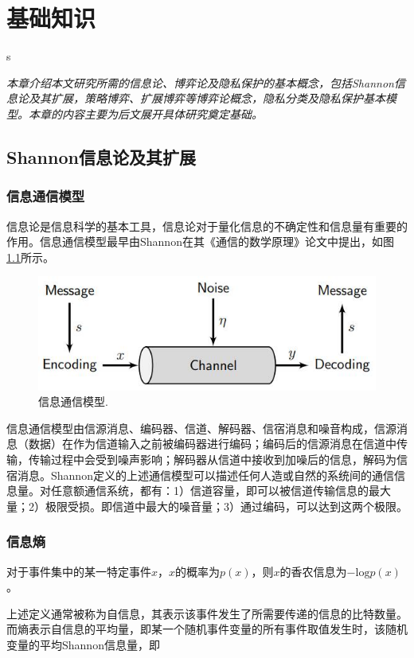\chapter{基础知识}
\label{chap:preliminary}

\textit{}s

\textit{本章介绍本文研究所需的信息论、博弈论及隐私保护的基本概念，包括Shannon信息论及其扩展，策略博弈、扩展博弈等博弈论概念，隐私分类及隐私保护基本模型。本章的内容主要为后文展开具体研究奠定基础。}
\section{Shannon信息论及其扩展}

\subsection{信息通信模型}
信息论\cite{shannon1948mathematical,
	stone2018information}是信息科学的基本工具，信息论对于量化信息的不确定性和信息量有重要的作用。信息通信模型最早由Shannon在其《通信的数学原理》论文中提出，如图\ref{fig:communication-model}所示。

\begin{figure}[htbp]
	\centering
	\includegraphics[width = 0.6\linewidth]{./figures/shannon-communicaiton-model.jpg}
	\caption{信息通信模型\cite{stone2018information}.
	}
	\label{fig:communication-model}
\end{figure}

信息通信模型\cite{stone2018information}由信源消息、编码器、信道、解码器、信宿消息和噪音构成，信源消息（数据）在作为信道输入之前被编码器进行编码；编码后的信源消息在信道中传输，传输过程中会受到噪声影响；解码器从信道中接收到加噪后的信息，解码为信宿消息。Shannon定义的上述通信模型可以描述任何人造或自然的系统间的通信信息量。对任意额通信系统，都有：1）信道容量，即可以被信道传输信息的最大量；2）极限受损。即信道中最大的噪音量；3）通过编码，可以达到这两个极限。



\subsection{信息熵}


\begin{definition}
	对于事件集中的某一特定事件$x$，$x$的概率为$p(x)$，则$x$的香农信息为$-\text{log}p(x)$。
\end{definition}
上述定义通常被称为自信息，其表示该事件发生了所需要传递的信息的比特数量。而熵表示自信息的平均量，即某一个随机事件变量的所有事件取值发生时，该随机变量的平均Shannon信息量，即

